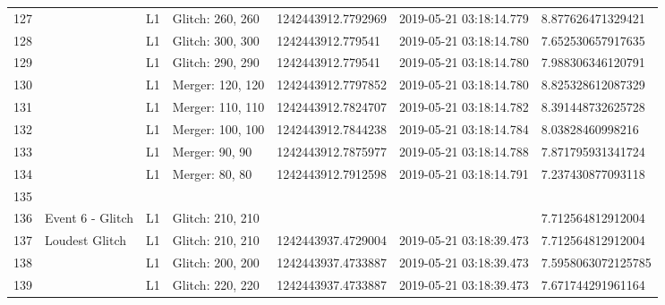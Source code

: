 \begin{longtable}{lllllll}
127  &                                                    &       L1 &  Glitch: 260, 260 &  1242443912.7792969 &  2019-05-21 03:18:14.779 &   8.877626471329421 \\
128  &                                                    &       L1 &  Glitch: 300, 300 &   1242443912.779541 &  2019-05-21 03:18:14.780 &   7.652530657917635 \\
129  &                                                    &       L1 &  Glitch: 290, 290 &   1242443912.779541 &  2019-05-21 03:18:14.780 &   7.988306346120791 \\
130  &                                                    &       L1 &  Merger: 120, 120 &  1242443912.7797852 &  2019-05-21 03:18:14.780 &   8.825328612087329 \\
131  &                                                    &       L1 &  Merger: 110, 110 &  1242443912.7824707 &  2019-05-21 03:18:14.782 &   8.391448732625728 \\
132  &                                                    &       L1 &  Merger: 100, 100 &  1242443912.7844238 &  2019-05-21 03:18:14.784 &    8.03828460998216 \\
133  &                                                    &       L1 &    Merger: 90, 90 &  1242443912.7875977 &  2019-05-21 03:18:14.788 &   7.871795931341724 \\
134  &                                                    &       L1 &    Merger: 80, 80 &  1242443912.7912598 &  2019-05-21 03:18:14.791 &   7.237430877093118 \\
135  &                                                    &          &                   &                     &                          &                     \\
136  &                                   Event 6 - Glitch &       L1 &  Glitch: 210, 210 &                     &                          &   7.712564812912004 \\
137  &                                     Loudest Glitch &       L1 &  Glitch: 210, 210 &  1242443937.4729004 &  2019-05-21 03:18:39.473 &   7.712564812912004 \\
138  &                                                    &       L1 &  Glitch: 200, 200 &  1242443937.4733887 &  2019-05-21 03:18:39.473 &  7.5958063072125785 \\
139  &                                                    &       L1 &  Glitch: 220, 220 &  1242443937.4733887 &  2019-05-21 03:18:39.473 &   7.671744291961164 \\

\end{longtable}
